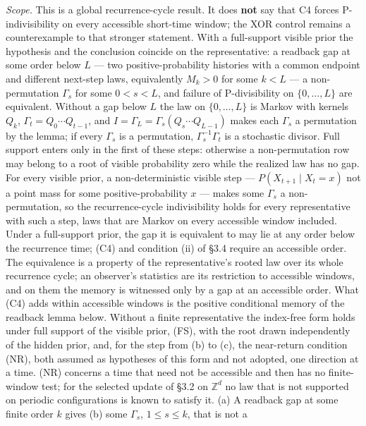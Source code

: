 \documentclass[
]{article}
\begin{document}
\emph{Scope.} This is a global recurrence-cycle result. It does
\textbf{not} say that C4 forces P-indivisibility on every accessible
short-time window; the XOR control remains a counterexample to that
stronger statement. With a full-support visible prior the hypothesis and
the conclusion coincide on the representative: a readback gap at some
order below \(L\) --- two positive-probability histories with a common
endpoint and different next-step laws, equivalently \(M_k > 0\) for some
\(k < L\) --- a non-permutation \(\Gamma_s\) for some \(0 < s < L\), and
failure of P-divisibility on \(\{0, \ldots, L\}\) are equivalent.
Without a gap below \(L\) the law on \(\{0, \ldots, L\}\) is Markov with
kernels \(Q_k\), \(\Gamma_t = Q_0 \cdots Q_{t-1}\), and
\(I = \Gamma_L = \Gamma_s (Q_s \cdots Q_{L-1})\) makes each \(\Gamma_s\)
a permutation by the lemma; if every \(\Gamma_s\) is a permutation,
\(\Gamma_s^{-1}\Gamma_t\) is a stochastic divisor. Full support enters
only in the first of these steps: otherwise a non-permutation row may
belong to a root of visible probability zero while the realized law has
no gap. For every visible prior, a non-deterministic visible step ---
\(P(X_{t+1} \mid X_t = x)\) not a point mass for some
positive-probability \(x\) --- makes some \(\Gamma_s\) a
non-permutation, so the recurrence-cycle indivisibility holds for every
representative with such a step, laws that are Markov on every
accessible window included. Under a full-support prior, the gap it is
equivalent to may lie at any order below the recurrence time; (C4) and
condition (ii) of §3.4 require an accessible order. The equivalence is a
property of the representative's rooted law over its whole recurrence
cycle; an observer's statistics are its restriction to accessible
windows, and on them the memory is witnessed only by a gap at an
accessible order. What (C4) adds within accessible windows is the
positive conditional memory of the readback lemma below. Without a
finite representative the index-free form holds under full support of
the visible prior, (FS), with the root drawn independently of the hidden
prior, and, for the step from (b) to (c), the near-return condition
(NR), both assumed as hypotheses of this form and not adopted, one
direction at a time. (NR) concerns a time that need not be accessible
and then has no finite-window test; for the selected update of §3.2 on
\(\mathbb{Z}^d\) no law that is not supported on periodic configurations
is known to satisfy it. (a) A readback gap at some finite order \(k\)
gives (b) some \(\Gamma_s\), \(1 \leq s \leq k\), that is not a
\end{document}
